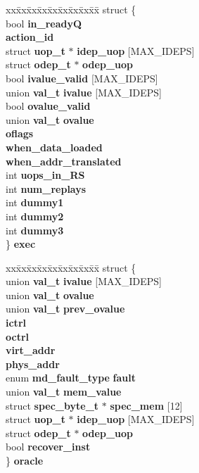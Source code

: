 \begin{CompactItemize}
\begin{tabbing}
\end{tabbing}\item 
\begin{tabbing}
xx\=xx\=xx\=xx\=xx\=xx\=xx\=xx\=xx\=\kill
struct \{\\
\>bool {\bf in\_readyQ}\\
 {\bf action\_id}\\
\>struct {\bf uop\_t} $\ast$ {\bf idep\_uop} [MAX\_IDEPS]\\
\>struct {\bf odep\_t} $\ast$ {\bf odep\_uop}\\
\>bool {\bf ivalue\_valid} [MAX\_IDEPS]\\
\>union {\bf val\_t} {\bf ivalue} [MAX\_IDEPS]\\
\>bool {\bf ovalue\_valid}\\
\>union {\bf val\_t} {\bf ovalue}\\
 {\bf oflags}\\
 {\bf when\_data\_loaded}\\
 {\bf when\_addr\_translated}\\
\>int {\bf uops\_in\_RS}\\
\>int {\bf num\_replays}\\
\>int {\bf dummy1}\\
\>int {\bf dummy2}\\
\>int {\bf dummy3}\\
\} {\bf exec}\\

\end{tabbing}\item 
\begin{tabbing}
xx\=xx\=xx\=xx\=xx\=xx\=xx\=xx\=xx\=\kill
struct \{\\
\>union {\bf val\_t} {\bf ivalue} [MAX\_IDEPS]\\
\>union {\bf val\_t} {\bf ovalue}\\
\>union {\bf val\_t} {\bf prev\_ovalue}\\
 {\bf ictrl}\\
 {\bf octrl}\\
 {\bf virt\_addr}\\
 {\bf phys\_addr}\\
\>enum {\bf md\_fault\_type} {\bf fault}\\
\>union {\bf val\_t} {\bf mem\_value}\\
\>struct {\bf spec\_byte\_t} $\ast$ {\bf spec\_mem} [12]\\
\>struct {\bf uop\_t} $\ast$ {\bf idep\_uop} [MAX\_IDEPS]\\
\>struct {\bf odep\_t} $\ast$ {\bf odep\_uop}\\
\>bool {\bf recover\_inst}\\
\} {\bf oracle}\\


\end{tabbing}
\end{CompactItemize}
